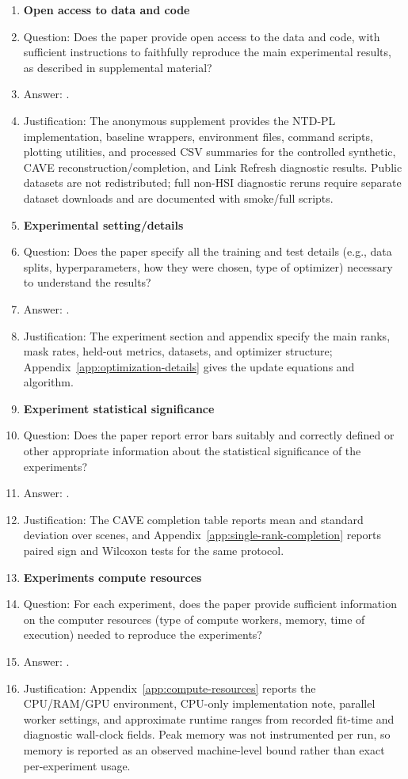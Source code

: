 \begin{enumerate}
\item {\bf Open access to data and code}
    \item[] Question: Does the paper provide open access to the data and code, with sufficient instructions to faithfully reproduce the main experimental results, as described in supplemental material?
    \item[] Answer: \answerPartial{}.
    \item[] Justification: The anonymous supplement provides the NTD-PL implementation, baseline wrappers, environment files, command scripts, plotting utilities, and processed CSV summaries for the controlled synthetic, CAVE reconstruction/completion, and Link Refresh diagnostic results. Public datasets are not redistributed; full non-HSI diagnostic reruns require separate dataset downloads and are documented with smoke/full scripts.

\item {\bf Experimental setting/details}
    \item[] Question: Does the paper specify all the training and test details (e.g., data splits, hyperparameters, how they were chosen, type of optimizer) necessary to understand the results?
    \item[] Answer: \answerYes{}.
    \item[] Justification: The experiment section and appendix specify the main ranks, mask rates, held-out metrics, datasets, and optimizer structure; Appendix~\ref{app:optimization-details} gives the update equations and algorithm.

\item {\bf Experiment statistical significance}
    \item[] Question: Does the paper report error bars suitably and correctly defined or other appropriate information about the statistical significance of the experiments?
    \item[] Answer: \answerYes{}.
    \item[] Justification: The CAVE completion table reports mean and standard deviation over scenes, and Appendix~\ref{app:single-rank-completion} reports paired sign and Wilcoxon tests for the same protocol.

\item {\bf Experiments compute resources}
    \item[] Question: For each experiment, does the paper provide sufficient information on the computer resources (type of compute workers, memory, time of execution) needed to reproduce the experiments?
    \item[] Answer: \answerPartial{}.
    \item[] Justification: Appendix~\ref{app:compute-resources} reports the CPU/RAM/GPU environment, CPU-only implementation note, parallel worker settings, and approximate runtime ranges from recorded fit-time and diagnostic wall-clock fields. Peak memory was not instrumented per run, so memory is reported as an observed machine-level bound rather than exact per-experiment usage.


\end{enumerate}
